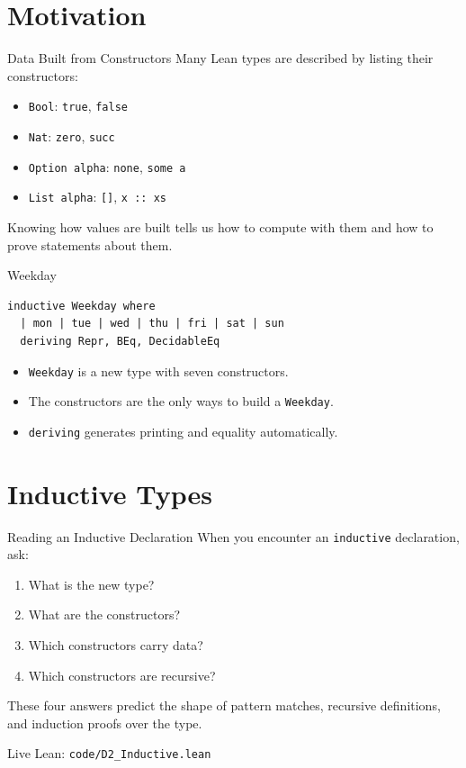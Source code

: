 ﻿\documentclass[aspectratio=169,11pt]{beamer}
\newcommand{\DTwoPartName}{Overview}
\newcommand{\setDTwoPart}[1]{\gdef\DTwoPartName{#1}}
\newcommand{\leanfile}[1]{\vfill{\small\color{gray}Live Lean: \texttt{#1}}}
\begin{document}
\setDTwoPart{Part I: Inductive}
\section{Motivation}

\begin{frame}{Data Built from Constructors}
  \hypertarget{part-inductive}{}
  Many Lean types are described by listing their constructors:

  \begin{itemize}
    \item \texttt{Bool}: \texttt{true}, \texttt{false}
    \item \texttt{Nat}: \texttt{zero}, \texttt{succ}
    \item \texttt{Option alpha}: \texttt{none}, \texttt{some a}
    \item \texttt{List alpha}: \texttt{[]}, \texttt{x :: xs}
  \end{itemize}

  Knowing how values are built tells us how to compute with them and how to prove statements about them.
\end{frame}

\begin{frame}[fragile]{Weekday}
  \begin{lstlisting}
inductive Weekday where
  | mon | tue | wed | thu | fri | sat | sun
  deriving Repr, BEq, DecidableEq
  \end{lstlisting}

  \begin{itemize}
    \item \texttt{Weekday} is a new type with seven constructors.
    \item The constructors are the only ways to build a \texttt{Weekday}.
    \item \texttt{deriving} generates printing and equality automatically.
  \end{itemize}
\end{frame}

\section{Inductive Types}

\begin{frame}{Reading an Inductive Declaration}
  When you encounter an \texttt{inductive} declaration, ask:

  \begin{enumerate}
    \item What is the new type?
    \item What are the constructors?
    \item Which constructors carry data?
    \item Which constructors are recursive?
  \end{enumerate}

  These four answers predict the shape of pattern matches, recursive definitions, and induction proofs over the type.

  \leanfile{code/D2\_Inductive.lean}
\end{frame}
\end{document}
